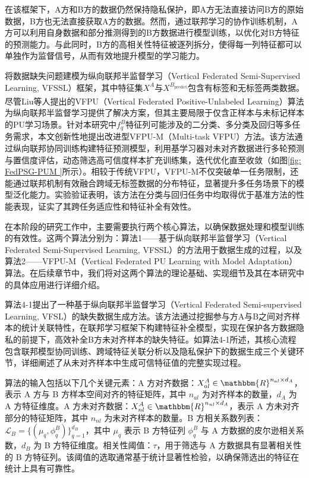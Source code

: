 在该框架下，A方和B方的数据仍然保持隐私保护，即A方无法直接访问B方的原始数据，B方也无法直接获取A方的数据。然而，通过联邦学习的协作训练机制，A方可以利用自身数据和部分推测得到的B方数据进行模型训练，以优化对B方特征的预测能力。与此同时，B方的高相关性特征被逐列拆分，使得每一列特征都可以单独作为监督信号，从而有效地提升模型的学习能力。

将数据缺失问题建模为纵向联邦半监督学习（Vertical Federated Semi-Supervised Learning, VFSSL）框架，其中特征集$X^A$与$X^{B_{\text{predict}}}$包含有标签和无标签两类数据。尽管Liu等人\textsuperscript{\cite{liu2023multi}}提出的VFPU（Vertical Federated Positive-Unlabeled Learning）算法为纵向联邦半监督学习提供了解决方案，但其主要局限于仅含正样本与未标记样本的PU学习场景。针对本研究中$f_q^B$特征列可能涉及的二分类、多分类及回归等多任务需求，本文创新性地提出改进型VFPU-M（Multi-task VFPU）方法。该方法通过纵向联邦协同训练构建特征预测模型，利用基学习器对未对齐数据进行多轮预测与置信度评估，动态筛选高可信度样本扩充训练集，迭代优化直至收敛（如图\ref{fig: FedPSG-PUM }所示）。相较于传统VFPU，VFPU-M不仅突破单一任务限制，还能通过联邦机制有效融合跨域无标签数据的分布特征，显著提升多任务场景下的模型泛化能力。实验验证表明，该方法在分类与回归任务中均取得优于基准方法的性能表现，证实了其跨任务适应性和特征补全有效性。

在本阶段的研究工作中，主要需要执行两个核心算法，以确保数据处理和模型训练的有效性。这两个算法分别为：算法1——基于纵向联邦半监督学习（Vertical Federated Semi-Supervised Learning, VFSSL）的方法用于数据生成的过程，以及算法2——VFPU-M（Vertical Federated PU Learning with Model Adaptation）算法。在后续章节中，我们将对这两个算法的理论基础、实现细节及其在本研究中的具体应用进行详细介绍。

算法4-1提出了一种基于纵向联邦半监督学习（Vertical Federated Semi-supervised Learning, VFSL）的缺失数据生成方法。该方法通过挖掘参与方A与B之间对齐样本的统计关联特性，在联邦学习框架下构建特征补全模型，实现在保护各方数据隐私的前提下，高效补全B方未对齐样本的缺失特征。如算法4-1所述，其核心流程包含联邦模型协同训练、跨域特征关联分析以及隐私保护下的数据生成三个关键环节，详细阐述了从未对齐样本中生成可信特征值的完整实现过程。

算法的输入包括以下几个关键元素：A 方对齐数据：$X_{al}^A \in \mathbbm{R}^{n_{al} \times d_A}$，表示 A 方与 B 方样本空间对齐的特征矩阵，其中 $n_{al}$ 为对齐样本的数量，$d_A$ 为 A 方特征维度。A 方未对齐数据：$X_{nl}^A \in \mathbbm{R}^{n_{nl} \times d_A}$，表示 A 方未对齐部分的特征矩阵，其中 $n_{nl}$ 为未对齐样本的数量。B 方相关系数列表：$\mathcal{L}_B = \{(\mu_q, \phi^B_q)\}_{q=1}^{d_B}$，其中 $\mu_q$ 表示 B 方特征列 $\phi^B_q$ 与 A 方数据的皮尔逊相关系数，$d_B$ 为 B 方特征维度。相关性阈值：$\tau$，用于筛选与 A 方数据具有显著相关性的 B 方特征列。该阈值的选取通常基于统计显著性检验，以确保筛选出的特征在统计上具有可靠性。

